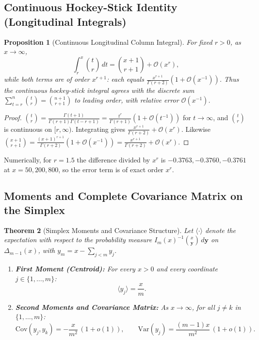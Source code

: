 \documentclass[11pt,a4paper]{article}
\theoremstyle{plain}
\newtheorem{theorem}{Theorem}[section]
\newtheorem{proposition}[theorem]{Proposition}
\theoremstyle{definition}
\theoremstyle{remark}
\numberwithin{equation}{section}
\begin{document}
\subsection{Continuous Hockey-Stick Identity (Longitudinal Integrals)}

\begin{proposition}[Continuous Longitudinal Column Integral]
\label{prop:hockey}
For fixed $r > 0$, as $x \to \infty$,
\begin{equation}
\int_r^x \binom{t}{r}\,dt = \binom{x+1}{r+1} + \mathcal{O}(x^r),
\end{equation}
while both terms are of order $x^{r+1}$: each equals $\frac{x^{r+1}}{\Gamma(r+2)}(1 + \mathcal{O}(x^{-1}))$. Thus the continuous hockey-stick integral agrees with the discrete sum $\sum_{t=r}^{n}\binom{t}{r} = \binom{n+1}{r+1}$ to leading order, with relative error $\mathcal{O}(x^{-1})$.
\end{proposition}
\begin{proof}
$\binom{t}{r} = \frac{\Gamma(t+1)}{\Gamma(r+1)\Gamma(t-r+1)} = \frac{t^r}{\Gamma(r+1)}(1 + \mathcal{O}(t^{-1}))$ for $t \to \infty$, and $\binom{t}{r}$ is continuous on $[r, \infty)$. Integrating gives $\frac{x^{r+1}}{\Gamma(r+2)} + \mathcal{O}(x^r)$. Likewise $\binom{x+1}{r+1} = \frac{(x+1)^{r+1}}{\Gamma(r+2)}(1 + \mathcal{O}(x^{-1})) = \frac{x^{r+1}}{\Gamma(r+2)} + \mathcal{O}(x^r)$.
\end{proof}
Numerically, for $r = 1.5$ the difference divided by $x^r$ is $-0.3763, -0.3760, -0.3761$ at $x = 50, 200, 800$, so the error term is of exact order $x^r$.

\subsection{Moments and Complete Covariance Matrix on the Simplex}

\begin{theorem}[Simplex Moments and Covariance Structure]
\label{thm:moments}
Let $\langle \cdot \rangle$ denote the expectation with respect to the probability measure $I_m(x)^{-1}\binom{x}{\mathbf{y}}\,d\mathbf{y}$ on $\Delta_{m-1}(x)$, with $y_m = x - \sum_{j<m} y_j$.
\begin{enumerate}
    \item \textbf{First Moment (Centroid):} For every $x > 0$ and every coordinate $j \in \{1, \dots, m\}$:
    \begin{equation}
    \langle y_j \rangle = \frac{x}{m}.
    \end{equation}
    \item \textbf{Second Moments and Covariance Matrix:} As $x \to \infty$, for all $j \ne k$ in $\{1,\dots,m\}$:
    \begin{equation}
    \mathrm{Cov}(y_j, y_k) = -\frac{x}{m^2}\,(1 + o(1)), \qquad
    \mathrm{Var}(y_j) = \frac{(m-1)x}{m^2}\,(1 + o(1)).
    \end{equation}
\end{enumerate}
\end{theorem}
\end{document}
